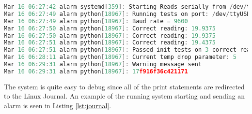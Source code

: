 \begin{lstlisting}[language=c, caption = {Logging entries in the Linux Journal as a result of the running system}, label = {lst:journal}]
Mar 16 06:27:42 alarm systemd[359]: Starting Reads serially from /dev/ttyUSB0 and puts in MongoDB...
Mar 16 06:27:49 alarm python[18967]: Running tests on port: /dev/ttyUSB0
Mar 16 06:27:49 alarm python[18967]: Baud rate = 9600
Mar 16 06:27:50 alarm python[18967]: Correct reading: 19.9375
Mar 16 06:27:50 alarm python[18967]: Correct reading: 19.9375
Mar 16 06:27:51 alarm python[18967]: Correct reading: 19.4375
Mar 16 06:27:51 alarm python[18967]: Passed init tests on 3 correct readings and 0 faulty readings
Mar 16 06:28:11 alarm python[18967]: Current temp drop parameter: 5
Mar 16 06:29:31 alarm python[18967]: Warning message sent
Mar 16 06:29:31 alarm python[18967]: 17f916f36c421171
\end{lstlisting}

The system is quite easy to debug since all of the print statements are redirected to the Linux Journal. An example of the running system starting and sending an alarm is seen in Listing \ref{lst:journal}.
